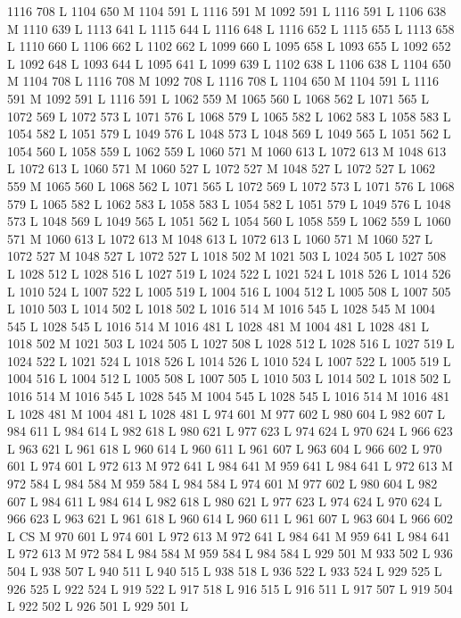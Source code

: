 {{{{{{{{{{{{{{{{{{1116 708 L
1104 650 M 1104 591 L
1116 591 M 1092 591 L
1116 591 L
1106 638 M 1110 639 L
1113 641 L
1115 644 L
1116 648 L
1116 652 L
1115 655 L
1113 658 L
1110 660 L
1106 662 L
1102 662 L
1099 660 L
1095 658 L
1093 655 L
1092 652 L
1092 648 L
1093 644 L
1095 641 L
1099 639 L
1102 638 L
1106 638 L
1104 650 M 1104 708 L
1116 708 M 1092 708 L
1116 708 L
1104 650 M 1104 591 L
1116 591 M 1092 591 L
1116 591 L
1062 559 M 1065 560 L
1068 562 L
1071 565 L
1072 569 L
1072 573 L
1071 576 L
1068 579 L
1065 582 L
1062 583 L
1058 583 L
1054 582 L
1051 579 L
1049 576 L
1048 573 L
1048 569 L
1049 565 L
1051 562 L
1054 560 L
1058 559 L
1062 559 L
1060 571 M 1060 613 L
1072 613 M 1048 613 L
1072 613 L
1060 571 M 1060 527 L
1072 527 M 1048 527 L
1072 527 L
1062 559 M 1065 560 L
1068 562 L
1071 565 L
1072 569 L
1072 573 L
1071 576 L
1068 579 L
1065 582 L
1062 583 L
1058 583 L
1054 582 L
1051 579 L
1049 576 L
1048 573 L
1048 569 L
1049 565 L
1051 562 L
1054 560 L
1058 559 L
1062 559 L
1060 571 M 1060 613 L
1072 613 M 1048 613 L
1072 613 L
1060 571 M 1060 527 L
1072 527 M 1048 527 L
1072 527 L
1018 502 M 1021 503 L
1024 505 L
1027 508 L
1028 512 L
1028 516 L
1027 519 L
1024 522 L
1021 524 L
1018 526 L
1014 526 L
1010 524 L
1007 522 L
1005 519 L
1004 516 L
1004 512 L
1005 508 L
1007 505 L
1010 503 L
1014 502 L
1018 502 L
1016 514 M 1016 545 L
1028 545 M 1004 545 L
1028 545 L
1016 514 M 1016 481 L
1028 481 M 1004 481 L
1028 481 L
1018 502 M 1021 503 L
1024 505 L
1027 508 L
1028 512 L
1028 516 L
1027 519 L
1024 522 L
1021 524 L
1018 526 L
1014 526 L
1010 524 L
1007 522 L
1005 519 L
1004 516 L
1004 512 L
1005 508 L
1007 505 L
1010 503 L
1014 502 L
1018 502 L
1016 514 M 1016 545 L
1028 545 M 1004 545 L
1028 545 L
1016 514 M 1016 481 L
1028 481 M 1004 481 L
1028 481 L
974 601 M 977 602 L
980 604 L
982 607 L
984 611 L
984 614 L
982 618 L
980 621 L
977 623 L
974 624 L
970 624 L
966 623 L
963 621 L
961 618 L
960 614 L
960 611 L
961 607 L
963 604 L
966 602 L
970 601 L
974 601 L
972 613 M 972 641 L
984 641 M 959 641 L
984 641 L
972 613 M 972 584 L
984 584 M 959 584 L
984 584 L
974 601 M 977 602 L
980 604 L
982 607 L
984 611 L
984 614 L
982 618 L
980 621 L
977 623 L
974 624 L
970 624 L
966 623 L
963 621 L
961 618 L
960 614 L
960 611 L
961 607 L
963 604 L
966 602 L
CS M
970 601 L
974 601 L
972 613 M 972 641 L
984 641 M 959 641 L
984 641 L
972 613 M 972 584 L
984 584 M 959 584 L
984 584 L
929 501 M 933 502 L
936 504 L
938 507 L
940 511 L
940 515 L
938 518 L
936 522 L
933 524 L
929 525 L
926 525 L
922 524 L
919 522 L
917 518 L
916 515 L
916 511 L
917 507 L
919 504 L
922 502 L
926 501 L
929 501 L
}}}}}}}}}}}}}}}}}}
